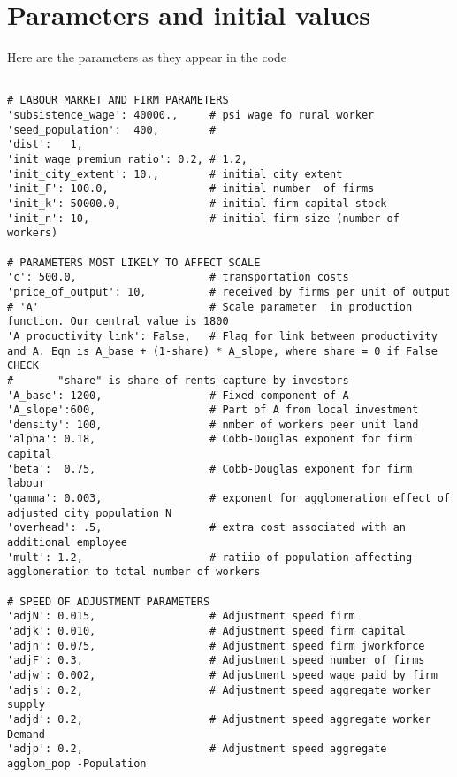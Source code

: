 \chapter{Parameters and initial values} \label{appendix-parameters}

Here are the parameters as they appear in the code 
{\small\begin{verbatim} 

# LABOUR MARKET AND FIRM PARAMETERS
'subsistence_wage': 40000.,     # psi wage fo rural worker
'seed_population':  400,        # 
'dist':   1, 
'init_wage_premium_ratio': 0.2, # 1.2,
'init_city_extent': 10.,        # initial city extent
'init_F': 100.0,                # initial number  of firms
'init_k': 50000.0,              # initial firm capital stock 
'init_n': 10,                   # initial firm size (number of workers)

# PARAMETERS MOST LIKELY TO AFFECT SCALE
'c': 500.0,                     # transportation costs
'price_of_output': 10,          # received by firms per unit of output
# 'A'                           # Scale parameter  in production function. Our central value is 1800
'A_productivity_link': False,   # Flag for link between productivity and A. Eqn is A_base + (1-share) * A_slope, where share = 0 if False CHECK
#       "share" is share of rents capture by investors 
'A_base': 1200,                 # Fixed component of A
'A_slope':600,                  # Part of A from local investment 
'density': 100,                 # nmber of workers peer unit land
'alpha': 0.18,                  # Cobb-Douglas exponent for firm capital
'beta':  0.75,                  # Cobb-Douglas exponent for firm labour
'gamma': 0.003,                 # exponent for agglomeration effect of adjusted city population N
'overhead': .5,                 # extra cost associated with an additional employee 
'mult': 1.2,                    # ratiio of population affecting agglomeration to total number of workers 

# SPEED OF ADJUSTMENT PARAMETERS 
'adjN': 0.015,                  # Adjustment speed firm
'adjk': 0.010,                  # Adjustment speed firm capital
'adjn': 0.075,                  # Adjustment speed firm jworkforce
'adjF': 0.3,                    # Adjustment speed number of firms
'adjw': 0.002,                  # Adjustment speed wage paid by firm
'adjs': 0.2,                    # Adjustment speed aggregate worker supply 
'adjd': 0.2,                    # Adjustment speed aggregate worker Demand 
'adjp': 0.2,                    # Adjustment speed aggregate agglom_pop -Population


\end{verbatim}}
